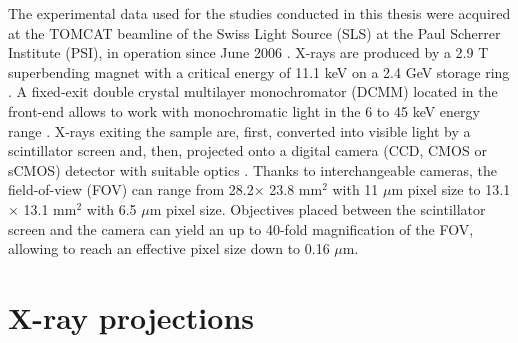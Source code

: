{\newline
The experimental data used for the studies conducted in this thesis were acquired at the TOMCAT beamline of
the Swiss Light Source (SLS) at the Paul Scherrer Institute (PSI), in operation since June 2006 \cite{Stampanoni2007}. 
X-rays are produced by a 2.9 T superbending magnet with a critical energy of 11.1 keV on a 2.4 GeV storage ring \cite{SLS2016}.
A fixed-exit double crystal multilayer monochromator (DCMM)
located in the front-end allows to work with monochromatic light  in the 6 to 45 keV energy range \cite{Stampanoni2002}. X-rays exiting the sample are,
first, converted into visible light by a scintillator screen and,
then, projected onto a digital camera (CCD, CMOS or sCMOS) detector with suitable optics \cite{Lovric2013}. 
Thanks to interchangeable cameras, the field-of-view
(FOV) can range from 28.2$\times$ 23.8 mm$^{2}$ with 11 $\mu $m pixel size to
13.1$\times$ 13.1 mm$^{2}$ with 6.5 $\mu $m pixel size. Objectives placed between the scintillator screen and the camera can 
yield an up to 40-fold magnification of the FOV, allowing to reach an effective pixel size down to 0.16 $\mu $m.

\section{X-ray projections}
}
